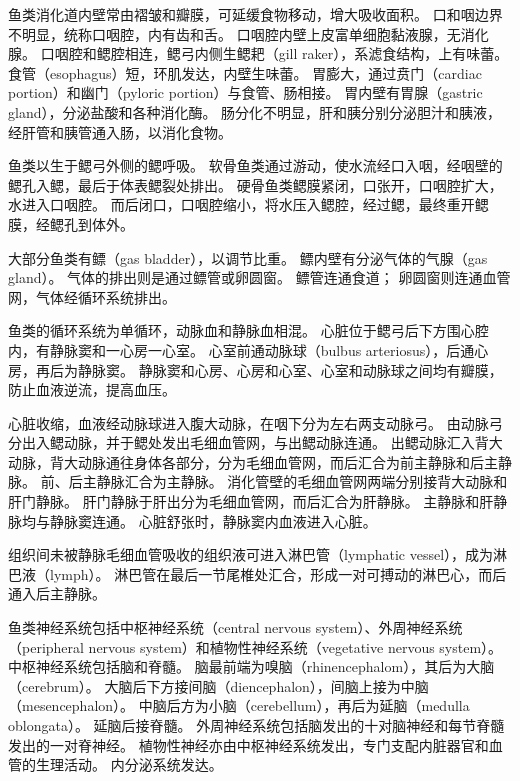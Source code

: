 \documentclass[11pt]{article}
\begin{document}
\newline

鱼类消化道内壁常由褶皱和瓣膜，可延缓食物移动，增大吸收面积。
口和咽边界不明显，统称口咽腔，内有齿和舌。
口咽腔内壁上皮富单细胞黏液腺，无消化腺。
口咽腔和鳃腔相连，鳃弓内侧生鳃耙（gill raker），系滤食结构，上有味蕾。
食管（esophagus）短，环肌发达，内壁生味蕾。
胃膨大，通过贲门（cardiac portion）和幽门（pyloric portion）与食管、肠相接。
胃内壁有胃腺（gastric gland），分泌盐酸和各种消化酶。
肠分化不明显，肝和胰分别分泌胆汁和胰液，经肝管和胰管通入肠，以消化食物。

\newline

鱼类以生于鳃弓外侧的鳃呼吸。
软骨鱼类通过游动，使水流经口入咽，经咽壁的鳃孔入鳃，最后于体表鳃裂处排出。
硬骨鱼类鳃膜紧闭，口张开，口咽腔扩大，水进入口咽腔。
而后闭口，口咽腔缩小，将水压入鳃腔，经过鳃，最终重开鳃膜，经鳃孔到体外。

\newline

大部分鱼类有鳔（gas bladder），以调节比重。
鳔内壁有分泌气体的气腺（gas gland）。
气体的排出则是通过鳔管或卵圆窗。
鳔管连通食道；
卵圆窗则连通血管网，气体经循环系统排出。

\newline

鱼类的循环系统为单循环，动脉血和静脉血相混。
心脏位于鳃弓后下方围心腔内，有静脉窦和一心房一心室。
心室前通动脉球（bulbus arteriosus），后通心房，再后为静脉窦。
静脉窦和心房、心房和心室、心室和动脉球之间均有瓣膜，防止血液逆流，提高血压。

\newline

心脏收缩，血液经动脉球进入腹大动脉，在咽下分为左右两支动脉弓。
由动脉弓分出入鳃动脉，并于鳃处发出毛细血管网，与出鳃动脉连通。
出鳃动脉汇入背大动脉，背大动脉通往身体各部分，分为毛细血管网，而后汇合为前主静脉和后主静脉。
前、后主静脉汇合为主静脉。
消化管壁的毛细血管网两端分别接背大动脉和肝门静脉。
肝门静脉于肝出分为毛细血管网，而后汇合为肝静脉。
主静脉和肝静脉均与静脉窦连通。
心脏舒张时，静脉窦内血液进入心脏。

\newline

组织间未被静脉毛细血管吸收的组织液可进入淋巴管（lymphatic vessel），成为淋巴液（lymph）。
淋巴管在最后一节尾椎处汇合，形成一对可搏动的淋巴心，而后通入后主静脉。

\newline

鱼类神经系统包括中枢神经系统（central nervous system）、外周神经系统（peripheral nervous system）和植物性神经系统（vegetative nervous system）。
中枢神经系统包括脑和脊髓。
脑最前端为嗅脑（rhinencephalom），其后为大脑（cerebrum）。
大脑后下方接间脑（diencephalon），间脑上接为中脑（mesencephalon）。
中脑后方为小脑（cerebellum），再后为延脑（medulla oblongata）。
延脑后接脊髓。
外周神经系统包括脑发出的十对脑神经和每节脊髓发出的一对脊神经。
植物性神经亦由中枢神经系统发出，专门支配内脏器官和血管的生理活动。
内分泌系统发达。
\end{document}
